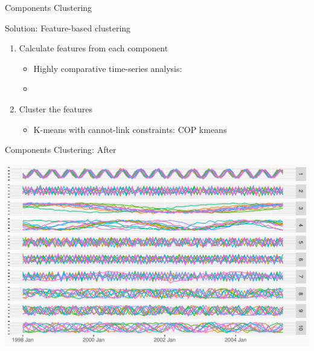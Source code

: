 \documentclass[14pt,ignorenonframetext,]{beamer}
\providecommand{\tightlist}{%
  \setlength{\itemsep}{0pt}\setlength{\parskip}{0pt}}
\begin{document}
\begin{frame}{Components Clustering}
\protect\hypertarget{components-clustering-1}{}
\begin{block}{Solution: Feature-based clustering}
\protect\hypertarget{solution-feature-based-clustering}{}
\begin{enumerate}
\tightlist
\item
  Calculate features from each component

  \begin{itemize}
  \tightlist
  \item
    Highly comparative time-series analysis: \citet{Fulcher2017-zl}
  \item
    \citet{Talagala2023-yi}
  \end{itemize}
\item
  Cluster the features

  \begin{itemize}
  \tightlist
  \item
    K-means with cannot-link constraints: COP kmeans
    \citet{Wagstaff2001-vc}
  \end{itemize}
\end{enumerate}
\end{block}
\end{frame}

\begin{frame}{Components Clustering: After}
\protect\hypertarget{components-clustering-after}{}
\begin{center}
\includegraphics[width=\linewidth]{plot/p_cluster_after}
\end{center}
\end{frame}
\end{document}
